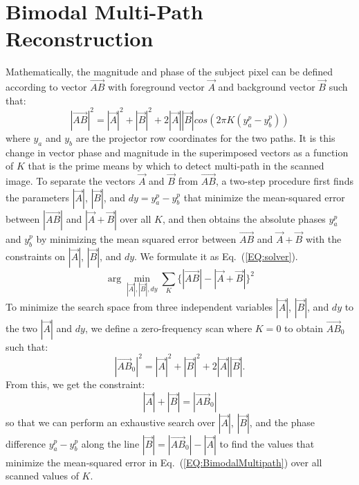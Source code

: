 \documentclass[10pt]{article}
\begin{document}
\section{Bimodal Multi-Path Reconstruction}
\noindent Mathematically, the magnitude and phase of the subject pixel can be defined according to vector $\vec{AB}$  with foreground vector $\vec{A}$ and background vector $\vec{B}$ such that:
\begin{equation}
\label{EQ:BimodalMultipath}
|\vec{AB}|^2  =  |\vec{A}|^2 + |\vec{B}|^2 + 2 |\vec{A}||\vec{B}| cos(2\pi K(y^p_a - y^p_b))
\end{equation}
where $y_a$ and $y_b$ are the projector row coordinates for the two paths. It is this change in vector phase and magnitude in the superimposed vectors as a function of $K$ that is the prime means by which to detect multi-path in the scanned image. To separate the vectors $\vec{A}$ and $\vec{B}$ from $\vec{AB}$, a two-step procedure first finds the parameters $|\vec{A}|$, $|\vec{B}|$, and $dy = y^p_a - y^p_b$ that minimize the mean-squared error between $|\vec{AB}|$ and $|\vec{A} + \vec{B}|$ over all $K$, and then obtains the absolute phases $y^p_a$ and $y^p_b$ by minimizing the mean squared error between $\vec{AB}$ and $\vec{A} + \vec{B}$ with the constraints on $|\vec{A}|$, $|\vec{B}|$, and $dy$. We formulate it as Eq.~(\ref{EQ:solver}). 
\begin{equation}
\label{EQ:solver}
\arg\min_{|\vec{A}|,|\vec{B}|,dy} \sum_K \{ |\vec{AB}| - |\vec{A} + \vec{B}| \}^2
\end{equation}
To minimize the search space from three independent variables $|\vec{A}|$, $|\vec{B}|$, and $dy$ to the two $|\vec{A}|$ and $dy$, we define a zero-frequency scan where $K=0$ to obtain $\vec{AB}_{0}$ such that:
\begin{equation}
|\vec{AB}_{0}|^2  =  |\vec{A}|^2 + |\vec{B}|^2 + 2 |\vec{A}||\vec{B}|.
\end{equation}
From this, we get the constraint:
\begin{equation}
|\vec{A}| + |\vec{B}| = |\vec{AB}_{0}|
\end{equation}
so that we can perform an exhaustive search over $|\vec{A}|$, $|\vec{B}|$, and the phase difference $y^p_a - y^p_b$ along the line $|\vec{B}| = |\vec{AB}_{0}| - |\vec{A}|$ to find the values that minimize the mean-squared error in Eq.~(\ref{EQ:BimodalMultipath}) over all scanned values of $K$.
\end{document}

